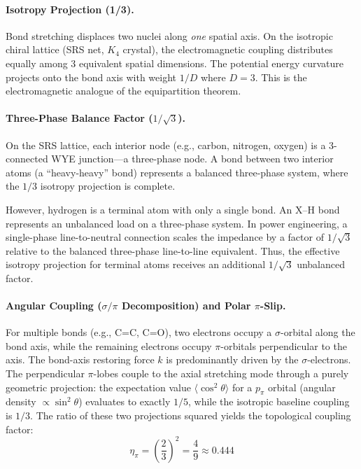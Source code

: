 \paragraph{Isotropy Projection (1/3).}
Bond stretching displaces two nuclei along \emph{one} spatial axis. On the isotropic chiral lattice (SRS net, $K_4$ crystal), the electromagnetic coupling distributes equally among 3 equivalent spatial dimensions. The potential energy curvature projects onto the bond axis with weight $1/D$ where $D = 3$. This is the electromagnetic analogue of the equipartition theorem.

\paragraph{Three-Phase Balance Factor ($1/\sqrt{3}$).}
On the SRS lattice, each interior node (e.g., carbon, nitrogen, oxygen) is a 3-connected WYE junction---a three-phase node. A bond between two interior atoms (a ``heavy-heavy'' bond) represents a balanced three-phase system, where the $1/3$ isotropy projection is complete. 

However, hydrogen is a terminal atom with only a single bond. An X--H bond represents an unbalanced load on a three-phase system. In power engineering, a single-phase line-to-neutral connection scales the impedance by a factor of $1/\sqrt{3}$ relative to the balanced three-phase line-to-line equivalent. Thus, the effective isotropy projection for terminal atoms receives an additional $1/\sqrt{3}$ unbalanced factor.

\paragraph{Angular Coupling ($\sigma/\pi$ Decomposition) and Polar $\pi$-Slip.}
For multiple bonds (e.g., C=C, C=O), two electrons occupy a $\sigma$-orbital along the bond axis, while the remaining electrons occupy $\pi$-orbitals perpendicular to the axis. The bond-axis restoring force $k$ is predominantly driven by the $\sigma$-electrons. The perpendicular $\pi$-lobes couple to the axial stretching mode through a purely geometric projection: the expectation value $\langle\cos^2\theta\rangle$ for a $p_\pi$ orbital (angular density $\propto \sin^2\theta$) evaluates to exactly $1/5$, while the isotropic baseline coupling is $1/3$. The ratio of these two projections squared yields the topological coupling factor:
\begin{equation}
    \eta_\pi = \left(\frac{2}{3}\right)^2 = \frac{4}{9} \approx 0.444
    \label{eq:pi_coupling}
\end{equation}

